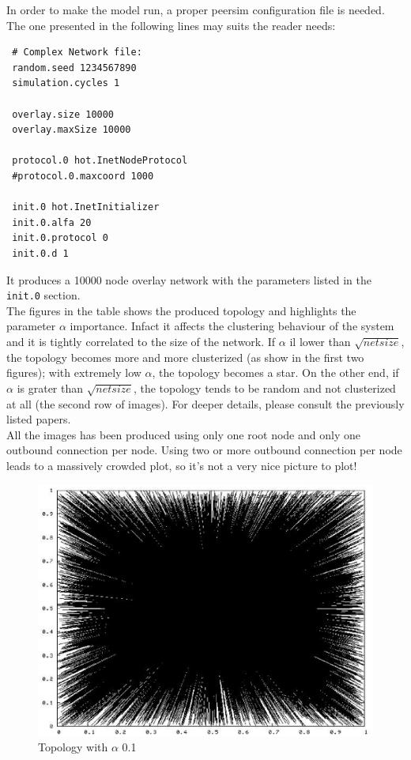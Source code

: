 \documentclass[a4paper,12pt]{article}
\begin{document}
 In order to make the model run, a proper peersim configuration file is 
needed. The one presented in the following lines may suits the reader needs:

\footnotesize
\begin{verbatim}
 # Complex Network file:
 random.seed 1234567890
 simulation.cycles 1
 
 overlay.size 10000
 overlay.maxSize 10000
 
 protocol.0 hot.InetNodeProtocol
 #protocol.0.maxcoord 1000
 
 init.0 hot.InetInitializer
 init.0.alfa 20
 init.0.protocol 0
 init.0.d 1
\end{verbatim}
\normalsize

 It produces a 10000 node overlay network with the parameters listed in 
the \texttt{init.0} section.\\
 The figures in the table shows the produced topology and highlights the 
parameter $\alpha$ importance. Infact it affects the clustering behaviour of 
the system and it is tightly correlated to the size of the network. If 
$\alpha$ il lower than $\sqrt{netsize}$, the topology becomes more and more 
clusterized (as show in the first two figures); with extremely low $\alpha$, 
the topology becomes a star. On the other end, if $\alpha$ is grater than 
$\sqrt{netsize}$, the topology tends to be random and not clusterized at all 
(the second row of images). For deeper details, please consult the previously
listed papers.\\

All the images has been produced using only one root node and only 
one outbound connection per node. Using two or more outbound connection 
per node leads to a massively crowded plot, so it's not a very nice picture 
to plot!\\

\begin{figure}
\begin{center}
\includegraphics[scale=0.6]{pic_alfa01.eps}
\end{center}
\caption{Topology with $\alpha$ 0.1\label{t01figure}}
\end{figure}
\end{document}

